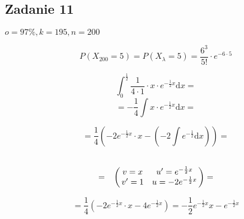 \subsection{Zadanie 11}

$o=97\%, k=195, n=200 $

$$P(X_{200} = 5) = P(X_\lambda = 5) = {\frac{6^3}{5!}} \cdot e^{-6 \cdot 5}$$

$$
\int_0^{\frac{1}{2}} {{\frac{1}{4 \cdot 1}} \cdot x} \cdot {e}^{-{\frac{1}{2}}x}
\mathrm{d}x =
$$
$$
= {-{\frac{1}{4}}} \int x \cdot {e}^{-{\frac{1}{2}}x}\mathrm{d}x=
$$

$$
= {\frac{1}{4}}({-2{e}^{-{\frac{1}{2}}x}} \cdot x - 
(-2\int{e}^{-{\frac{1}{2}}}\mathrm{d}x))=
$$

$$
=
\bordermatrix{~ & &  \cr
                & v=x & {u'}={e}^{-{\frac{1}{2}}x} \cr
                & {v'}=1 & u = -2 {e}^{-{\frac{1}{2}}x} \cr} = 
$$

$$
= {\frac{1}{4}}(-2{{e}^{-{\frac{1}{2}}x}} \cdot x - 4{{e}^{-{\frac{1}{2}}x}}) =
-{\frac{1}{2}}{{e}^{-{\frac{1}{2}}x}}x - {{e}^{-{\frac{1}{2}}x}}
$$
